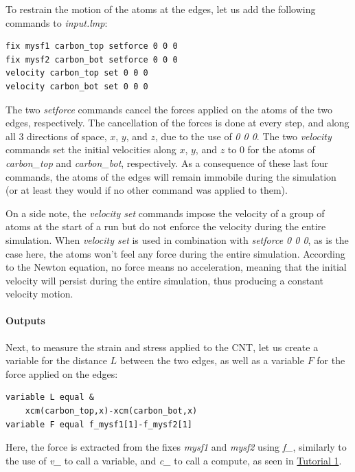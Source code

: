 \documentclass[9pt,tutorial]{livecoms}
\begin{document}
To restrain the motion of the atoms at the edges, let us add the following
commands to \textit{input.lmp}:
{\normalsize \begin{verbatim}
fix mysf1 carbon_top setforce 0 0 0
fix mysf2 carbon_bot setforce 0 0 0
velocity carbon_top set 0 0 0
velocity carbon_bot set 0 0 0
\end{verbatim}}
The two \textit{setforce} commands cancel the forces applied on the atoms of the
two edges, respectively. The cancellation of the forces is done at every step,
and along all 3 directions of space, $x$, $y$, and $z$, due to the use of
\textit{0 0 0}. The two \textit{velocity} commands set the initial velocities
along $x$, $y$, and $z$ to 0 for the atoms of \textit{carbon\_top} and
\textit{carbon\_bot}, respectively. As a consequence of these last four commands,
the atoms of the edges will remain immobile during the simulation (or at least
they would if no other command was applied to them).

On a side note, the \textit{velocity set}
commands impose the velocity of a group of atoms at the start of a run but do
not enforce the velocity during the entire simulation. When \textit{velocity set}
is used in combination with \textit{setforce 0 0 0}, as is the case here, the
atoms won't feel any force during the entire simulation. According to the Newton
equation, no force means no acceleration, meaning that the initial velocity
will persist during the entire simulation, thus producing a constant velocity motion.

\paragraph{Outputs}
Next, to measure the strain and stress applied to the CNT, let us create a
variable for the distance $L$ between the two edges, as well as  a variable $F$
for the force applied on the edges:
{\normalsize \begin{verbatim}
variable L equal &
    xcm(carbon_top,x)-xcm(carbon_bot,x)
variable F equal f_mysf1[1]-f_mysf2[1]
\end{verbatim}}
Here, the force is extracted from the fixes \textit{mysf1} and \textit{mysf2}
using \textit{f\_}, similarly to the use of \textit{v\_} to call a variable,
and \textit{c\_} to call a compute, as seen in \hyperref[lennard-jones-label]{Tutorial 1}.
\end{document}
